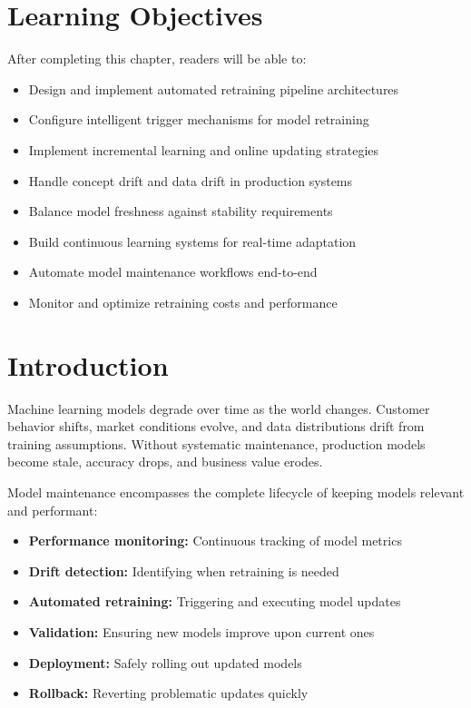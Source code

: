 \section{Learning Objectives}

After completing this chapter, readers will be able to:
\begin{itemize}
    \item Design and implement automated retraining pipeline architectures
    \item Configure intelligent trigger mechanisms for model retraining
    \item Implement incremental learning and online updating strategies
    \item Handle concept drift and data drift in production systems
    \item Balance model freshness against stability requirements
    \item Build continuous learning systems for real-time adaptation
    \item Automate model maintenance workflows end-to-end
    \item Monitor and optimize retraining costs and performance
\end{itemize}

\section{Introduction}

Machine learning models degrade over time as the world changes. Customer behavior shifts, market conditions evolve, and data distributions drift from training assumptions. Without systematic maintenance, production models become stale, accuracy drops, and business value erodes.

Model maintenance encompasses the complete lifecycle of keeping models relevant and performant:

\begin{itemize}
    \item \textbf{Performance monitoring:} Continuous tracking of model metrics
    \item \textbf{Drift detection:} Identifying when retraining is needed
    \item \textbf{Automated retraining:} Triggering and executing model updates
    \item \textbf{Validation:} Ensuring new models improve upon current ones
    \item \textbf{Deployment:} Safely rolling out updated models
    \item \textbf{Rollback:} Reverting problematic updates quickly
\end{itemize}

